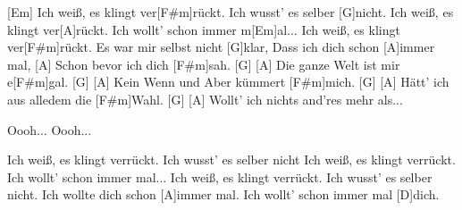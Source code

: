 \begin{guitar}
	[Em] Ich weiß, es klingt ver[F#m]rückt. Ich wusst' es selber [G]nicht.
	Ich weiß, es klingt ver[A]rückt. Ich wollt' schon immer m[Em]al...
	Ich weiß, es klingt ver[F#m]rückt. Es war mir selbst nicht [G]klar,
	Dass ich dich schon [A]immer mal,
	[A] Schon bevor ich dich [F#m]sah. [G]{}
	[A] Die ganze Welt ist mir e[F#m]gal. [G]{}
	[A] Kein Wenn und Aber kümmert [F#m]mich. [G]{}
	[A] Hätt' ich aus alledem die [F#m]Wahl. [G]{}
	[A] Wollt' ich nichts and'res mehr als...
	
	Oooh...
	Oooh...
	
	\begin{highlightbar}
		 
	\end{highlightbar}
	
	Ich weiß, es klingt verrückt. Ich wusst' es selber nicht
	Ich weiß, es klingt verrückt. Ich wollt' schon immer mal...
	Ich weiß, es klingt verrückt. Ich wusst' es selber nicht.
	Ich wollte dich schon [A]immer mal. Ich wollt' schon immer mal [D]dich.
\end{guitar}

